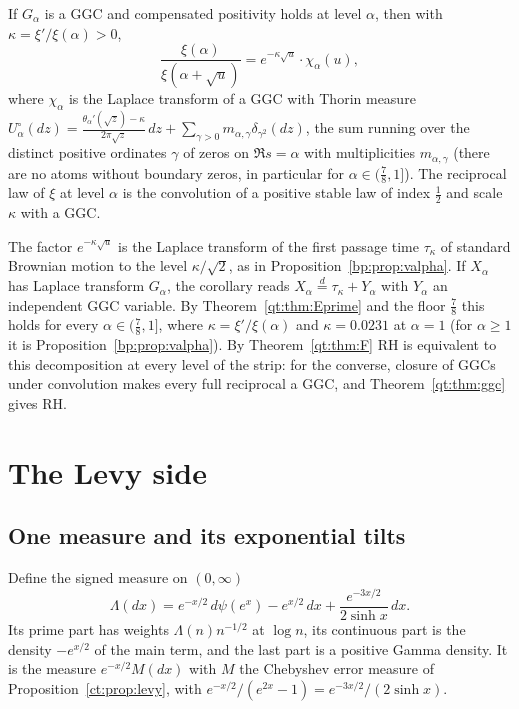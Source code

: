 \begin{corollary}\label{qt:cor:stable}
If $G_\alpha$ is a GGC and compensated positivity holds at level $\alpha$, then with $\kappa=\xi'/\xi(\alpha)>0$,
\[
\frac{\xi(\alpha)}{\xi(\alpha+\sqrt u)}=e^{-\kappa\sqrt u}\cdot\chi_\alpha(u),
\]
where $\chi_\alpha$ is the Laplace transform of a GGC with Thorin measure $U^\circ_\alpha(dz)=\frac{\theta_\alpha'(\sqrt z)-\kappa}{2\pi\sqrt z}\,dz+\sum_{\gamma>0}m_{\alpha,\gamma}\delta_{\gamma^2}(dz)$, the sum running over the distinct positive ordinates $\gamma$ of zeros on $\Re s=\alpha$ with multiplicities $m_{\alpha,\gamma}$ (there are no atoms without boundary zeros, in particular for $\alpha\in(\tfrac78,1]$). The reciprocal law of $\xi$ at level $\alpha$ is the convolution of a positive stable law of index $\tfrac12$ and scale $\kappa$ with a GGC.
\end{corollary}

The factor $e^{-\kappa\sqrt u}$ is the Laplace transform of the first passage time $\tau_\kappa$ of standard Brownian motion to the level $\kappa/\sqrt2$, as in Proposition~\ref{bp:prop:valpha}. If $X_\alpha$ has Laplace transform $G_\alpha$, the corollary reads $X_\alpha\overset{d}{=}\tau_\kappa+Y_\alpha$ with $Y_\alpha$ an independent GGC variable. By Theorem~\ref{qt:thm:Eprime} and the floor $\tfrac78$ this holds for every $\alpha\in(\tfrac78,1]$, where $\kappa=\xi'/\xi(\alpha)$ and $\kappa=0.0231$ at $\alpha=1$ (for $\alpha\ge1$ it is Proposition~\ref{bp:prop:valpha}). By Theorem~\ref{qt:thm:F} RH is equivalent to this decomposition at every level of the strip: for the converse, closure of GGCs under convolution makes every full reciprocal a GGC, and Theorem~\ref{qt:thm:ggc} gives RH.

\section{The Levy side}\label{qt:sec:levy}

\subsection{One measure and its exponential tilts}

Define the signed measure on $(0,\infty)$
\[
\Lambda(dx)=e^{-x/2}\,d\psi(e^x)-e^{x/2}\,dx+\frac{e^{-3x/2}}{2\sinh x}\,dx .
\]
Its prime part has weights $\Lambda(n)n^{-1/2}$ at $\log n$, its continuous part is the density $-e^{x/2}$ of the main term, and the last part is a positive Gamma density. It is the measure $e^{-x/2}M(dx)$ with $M$ the Chebyshev error measure of Proposition~\ref{ct:prop:levy}, with $e^{-x/2}/(e^{2x}-1)=e^{-3x/2}/(2\sinh x)$.

